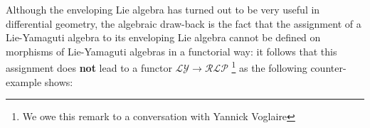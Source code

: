 \documentclass [11pt] {article}
\theoremstyle{definition}
\begin{document}
Although the enveloping Lie algebra has turned out to be very useful in differential geometry, the algebraic draw-back is the fact that 
the assignment of
a Lie-Yamaguti algebra to its enveloping Lie algebra cannot be defined on
morphisms of Lie-Yamaguti algebras in a functorial way: it follows that this assignment
does \textbf{not} lead to a functor $\mathcal{LY}\to\mathcal{RLP}$
\footnote{We owe this remark to a conversation with
Yannick Voglaire} as the following counter-example shows:
\end{document}
